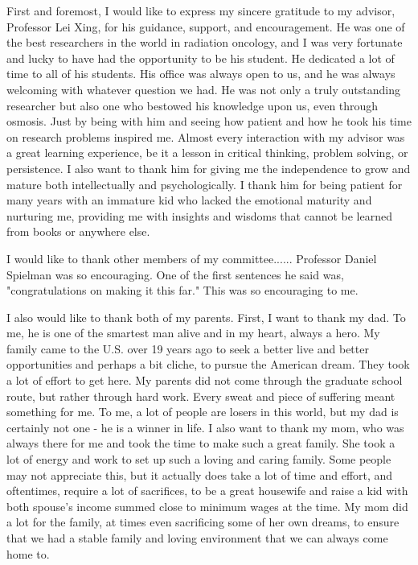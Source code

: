 
First and foremost, I would like to express my sincere gratitude to my advisor, Professor Lei Xing, for his guidance, support, and encouragement. He was one of the best researchers in the world in radiation oncology, and I was very fortunate and lucky to have had the opportunity to be his student. He dedicated a lot of time to all of his students. His office was always open to us, and he was always welcoming with whatever question we had. He was not only a truly outstanding researcher but also one who bestowed his knowledge upon us, even through osmosis. Just by being with him and seeing how patient and how he took his time on research problems inspired me. Almost every interaction with my advisor was a great learning experience, be it a lesson in critical thinking, problem solving, or persistence. I also want to thank him for giving me the independence to grow and mature both intellectually and psychologically. I thank him for being patient for many years with an immature kid who lacked the emotional maturity and nurturing me, providing me with insights and wisdoms that cannot be learned from books or anywhere else.

I would like to thank other members of my committee...... Professor Daniel Spielman was so encouraging. One of the first sentences he said was, "congratulations on making it this far." This was so encouraging to me. 

I also would like to thank both of my parents. First, I want to thank my dad. To me, he is one of the smartest man alive and in my heart, always a hero. My family came to the U.S. over 19 years ago to seek a better live and better opportunities and perhaps a bit cliche, to pursue the American dream. They took a lot of effort to get here. My parents did not come through the graduate school route, but rather through hard work. Every sweat and piece of suffering meant something for me. To me, a lot of people are losers in this world, but my dad is certainly not one - he is a winner in life. I also want to thank my mom, who was always there for me and took the time to make such a great family. She took a lot of energy and work to set up such a loving and caring family. Some people may not appreciate this, but it actually does take a lot of time and effort, and oftentimes, require a lot of sacrifices, to be a great housewife and raise a kid with both spouse's income summed close to minimum wages at the time. My mom did a lot for the family, at times even sacrificing some of her own dreams, to ensure that we had a stable family and loving environment that we can always come home to.

